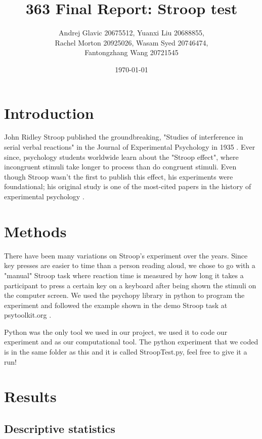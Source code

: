 \documentclass{article}
\author{Andrej Glavic 20675512, Yuanxi Liu 20688855, \\ Rachel Morton 20925026, Wasam Syed 20746474,\\ Fantongzhang Wang 20721545}
\date{\today}
\title{363 Final Report: Stroop test}
\begin{document}
\maketitle
\tableofcontents

\setlength{\voffset}{-1in}
\setlength{\textheight}{225mm}


\section{Introduction}
\label{sec:org8660043}
John Ridley Stroop published the groundbreaking, "Studies of interference in serial verbal reactions" in the Journal of Experimental Psychology in 1935 \cite{Stroop1935}. Ever since, psychology students worldwide learn about the "Stroop effect", where incongruent stimuli take longer to process than do congruent stimuli. Even though Stroop wasn't the first to publish this effect, his experiments were foundational; his original study is one of the most-cited papers in the history of experimental psychology \cite{MacLeod1991Stroop}.

\section{Methods}
\label{sec:org6a1438e}
There have been many variations on Stroop's experiment over the years. Since key presses are easier to time than a person reading aloud, we chose to go with a "manual" Stroop task where reaction time is measured by how long it takes a participant to press a certain key on a keyboard after being shown the stimuli on the computer screen. We used the psychopy library in python to program the experiment \cite{Peirce2019Psychopy} and followed the example shown in the demo Stroop task at psytoolkit.org \cite{PsytoolkitStroopDemo}. 

Python was the only tool we used in our project, we used it to code our experiment and as our computational tool. The python experiment that we coded is in the same folder as this and it is called StroopTest.py, feel free to give it a run!


\section{Results}
\label{sec:orgac913d3}

\subsection{Descriptive statistics}
\label{sec:org0532712}
\end{document}
